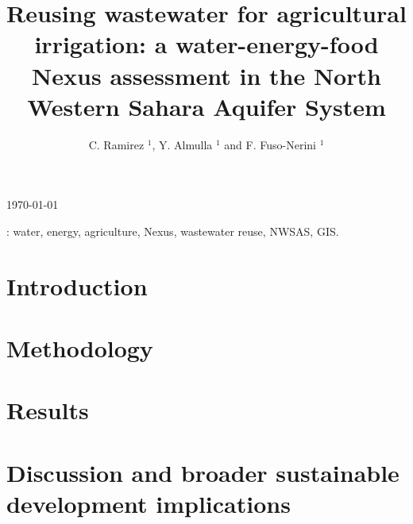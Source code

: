 \documentclass[12pt]{iopart}
\begin{document}
\title[Reusing wastewater in agriculture: a WEF Nexus assessment in the NWSAS]{Reusing wastewater for agricultural irrigation: a water-energy-food Nexus assessment in the North Western Sahara Aquifer System}

\author{C. Ramirez $^{1}$, Y. Almulla $^{1}$ and F. Fuso-Nerini $^{1}$}

\address{$^{1}$ KTH Royal Institute of Technology, Stockholm, Sweden}
\vspace{10pt}
\begin{indented}
\item[]\today
\end{indented}

\begin{abstract}

\end{abstract}

\vspace{1pc}
: water, energy, agriculture, Nexus, wastewater reuse, NWSAS, GIS.

\submitto{\ERL}
%
% 
%
\section{Introduction}


\section{Methodology}


\section{Results}


\section{Discussion and broader sustainable development implications}


\newcommand{\newblock}{}


\end{document}
